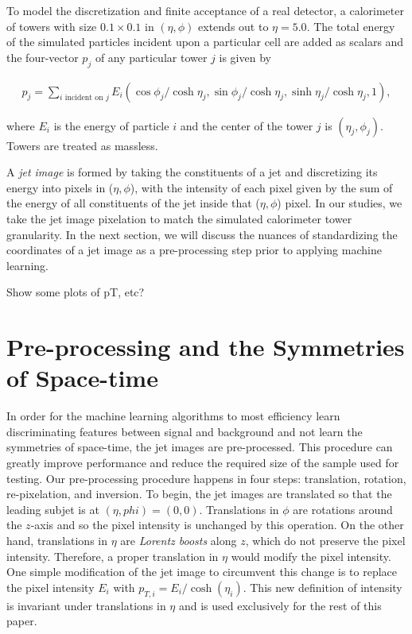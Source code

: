 To model the discretization and finite acceptance of a real detector, a calorimeter of towers with size $0.1\times 0.1$ in $(\eta,\phi)$ extends out to $\eta=5.0$.  The total energy of the simulated particles incident upon a particular cell are added as scalars and the four-vector $p_j$ of any particular tower $j$ is given by

\begin{align}
\label{eq:calo}
p_j = \sum_{i\text{ incident on $j$}}E_i(\cos\phi_j/\cosh \eta_j,\sin\phi_j/\cosh \eta_j,\sinh \eta_j/\cosh \eta_j,1),
\end{align}

\noindent where $E_i$ is the energy of particle $i$ and the center of the tower $j$ is $(\eta_j,\phi_j)$.  Towers are treated as massless.

 A {\it jet image} is formed by taking the constituents of a jet and discretizing its energy into pixels in ($\eta,\phi$), with the intensity of each pixel given by the sum of the energy of all constituents of the jet inside that ($\eta,\phi$) pixel.  In our studies, we take the jet image pixelation to match the simulated calorimeter tower granularity.  In the next section, we will discuss the nuances of standardizing the coordinates of a jet image as a pre-processing step prior to applying machine learning.  
 
Show some plots of pT, etc?

\section{Pre-processing and the Symmetries of Space-time}

In order for the machine learning algorithms to most efficiency learn discriminating features between signal and background and not learn the symmetries of space-time, the jet images are pre-processed.  This procedure can greatly improve performance and reduce the required size of the sample used for testing.  Our pre-processing procedure happens in four steps: translation, rotation, re-pixelation, and inversion.  To begin, the jet images are translated so that the leading subjet is at $(\eta,phi)=(0,0)$.  Translations in $\phi$ are rotations around the $z$-axis and so the pixel intensity is unchanged by this operation.  On the other hand, translations in $\eta$ are {\it Lorentz boosts} along $z$, which do not preserve the pixel intensity.  Therefore, a proper translation in $\eta$ would modify the pixel intensity.  One simple modification of the jet image to circumvent this change is to replace the pixel intensity $E_i$ with $p_{T,i}=E_i/\cosh(\eta_i)$.  This new definition of intensity is invariant under translations in $\eta$ and is used exclusively for the rest of this paper.

